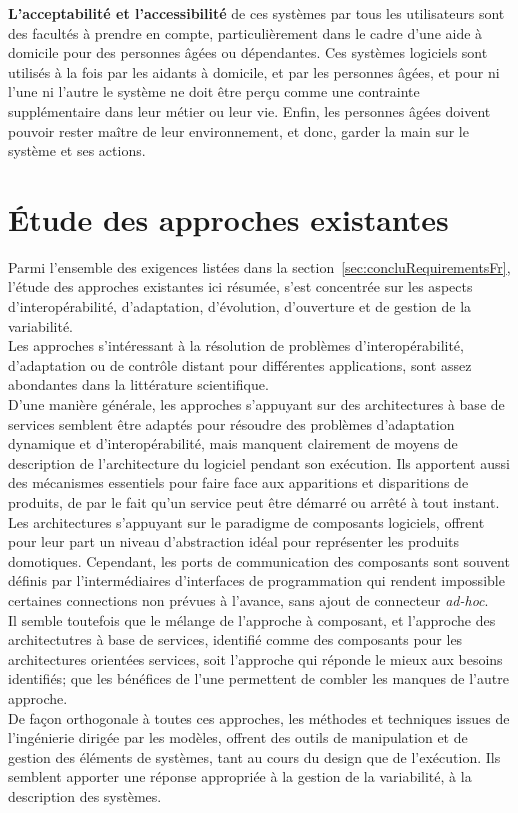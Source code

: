 {\bf L'acceptabilité et l'accessibilité} de ces systèmes par tous les utilisateurs sont des facultés à prendre en compte, particulièrement dans le cadre d'une aide à domicile pour des personnes âgées ou dépendantes. Ces systèmes logiciels sont utilisés à la fois par les aidants à domicile, et par les personnes âgées, et pour ni l'une ni l'autre le système ne doit être perçu comme une contrainte supplémentaire dans leur métier ou leur vie. Enfin, les personnes âgées doivent pouvoir rester maître de leur environnement, et donc, garder la main sur le système et ses actions.\\


\section{Étude des approches existantes}

Parmi l'ensemble des exigences listées dans la section~\ref{sec:concluRequirementsFr}, l'étude des approches existantes ici résumée, s'est concentrée sur les aspects d'interopérabilité, d'adaptation, d'évolution, d'ouverture et de gestion de la variabilité.\\

Les approches s'intéressant à la résolution de problèmes d'interopérabilité, d'adaptation ou de contrôle distant pour différentes applications, sont assez abondantes dans la littérature scientifique.\\
D'une manière générale, les approches s'appuyant sur des architectures à base de services semblent être adaptés pour résoudre des problèmes d'adaptation dynamique et d'interopérabilité, mais manquent clairement de moyens de description de l'architecture du logiciel pendant son exécution. Ils apportent aussi des mécanismes essentiels pour faire face aux apparitions et disparitions de produits, de par le fait qu'un service peut être démarré ou arrêté à tout instant.\\
Les architectures s'appuyant sur le paradigme de composants logiciels, offrent pour leur part un niveau d'abstraction idéal pour représenter les produits domotiques. Cependant, les ports de communication des composants sont souvent définis par l'intermédiaires d'interfaces de programmation qui rendent impossible certaines connections non prévues à l'avance, sans ajout de connecteur {\it ad-hoc}.\\
Il semble toutefois que le mélange de l'approche à composant, et l'approche des architectutres à base de services, identifié comme des composants pour les architectures orientées services, soit l'approche qui réponde le mieux aux besoins identifiés; que les bénéfices de l'une permettent de combler les manques de l'autre approche.\\
De façon orthogonale à toutes ces approches, les méthodes et techniques issues de l'ingénierie dirigée par les modèles, offrent des outils de manipulation et de gestion des éléments de systèmes, tant au cours du design que de l'exécution. Ils semblent apporter une réponse appropriée à la gestion de la variabilité, à la description des systèmes.\\

